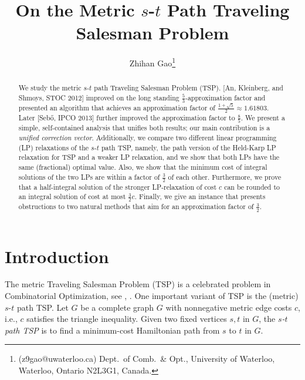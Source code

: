 \documentclass[11pt]{article}
\begin{document}
\title {On the Metric $s$-$t$ Path Traveling Salesman Problem}
\author{
Zhihan Gao\thanks{
        (z9gao@uwaterloo.ca)
	Dept.\ of Comb.\ \& Opt.,
        University of Waterloo, Waterloo, Ontario N2L3G1, Canada.
	}
}


\date{}
\maketitle



\begin{abstract}
We study the metric $s$-$t$ path Traveling Salesman Problem (TSP).
[An, Kleinberg, and Shmoys, STOC 2012] improved on
the long standing $\frac{5}{3}$-approximation factor and
presented an algorithm that achieves an approximation factor of
$\frac{1+\sqrt{5}}{2}\approx1.61803$.
Later [Seb\H{o}, IPCO 2013] further improved the approximation factor
to $\frac{8}{5}$.
We present a simple, self-contained analysis that
unifies both results;
our main contribution is a \emph{unified correction vector}.
Additionally, we compare two different linear programming (LP) relaxations of
the $s$-$t$ path TSP, namely,
the path version of the Held-Karp LP relaxation for TSP
and a weaker LP relaxation, and we show that both LPs have
the same (fractional) optimal value. Also, we show that the minimum cost of integral solutions of the
two LPs are within a factor of $\frac{3}{2}$ of each other.
Furthermore, we prove that a half-integral solution of the stronger LP-relaxation of
cost $c$ can be rounded to an integral solution of cost at most $\frac{3}{2}c$.
Finally, we give an instance that presents obstructions to
two natural methods that aim for an approximation factor of $\frac{3}{2}$.
\end{abstract}




\section{Introduction}

The metric Traveling Salesman Problem (TSP) is a celebrated
problem in Combinatorial Optimization, see \cite[Chapter 58]{Sch03}, \cite{BB08}. One important variant of TSP
is the (metric) $s$-$t$ path TSP. Let $G$ be a complete graph $G$ with
nonnegative metric edge costs $c$, i.e., $c$ satisfies the triangle inequality.
Given two fixed vertices $s, t$ in $G$, the
\emph{$s$-$t$ path TSP} is to find a minimum-cost Hamiltonian path
from $s$ to $t$ in $G$.
\end{document}
